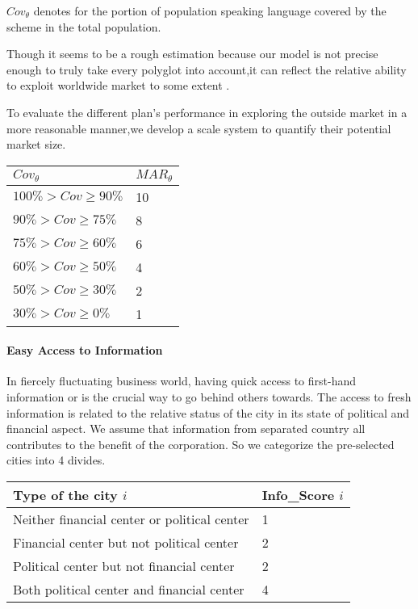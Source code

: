\documentclass{mcmthesis}
\begin{document}
$Cov_\theta$ denotes for the portion of population speaking language covered by the scheme in the total population.

Though it seems to be a rough estimation because our model is not precise enough to truly take every polyglot into account,it can reflect the relative ability to exploit worldwide market to some extent .

To evaluate the different plan's performance in exploring the outside market in a more reasonable manner,we develop a scale system to quantify their potential market size.


\noindent \begin{tabu} to \linewidth { X[c]  X[c]}
    \hline
  \textbf{$Cov_\theta$} & \textbf{$MAR_\theta$} \\ \hline
    $100\%>Cov\geqslant90\%$ & 10\\
    $90\%>Cov\geqslant75\%$ & 8\\
    $75\%>Cov\geqslant60\%$ & 6\\
    $60\%>Cov\geqslant50\%$ & 4\\
    $50\%>Cov\geqslant30\%$ & 2\\
    $30\%>Cov\geqslant0\%$ & 1\\ \hline
\end{tabu}


\paragraph{Easy Access to Information}
In fiercely fluctuating business world, having quick access to first-hand information or is the crucial way to go behind others towards. The access to fresh information is related to the relative status of the city in its state of political and financial aspect. We assume that information from separated country all contributes to the benefit of the corporation. So we categorize the pre-selected cities into 4 divides.

\noindent \begin{tabu} to \linewidth { X[c]  X[c]}
    \hline
    Type of the city $i$ & Info\_Score $i$\\ \hline
    Neither financial center or political center & 1\\
    Financial center but not political center & 2\\
    Political center but not financial center & 2\\
    Both political center and financial center & 4\\ \hline
\end{tabu}
\end{document}
